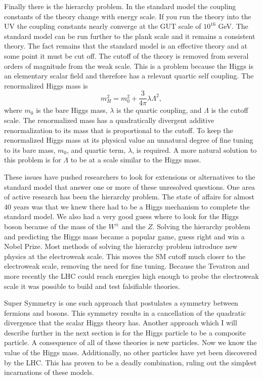 Finally there is the hierarchy problem.
In the standard model the coupling constants of the theory change with energy scale.
If you run the theory into the UV the coupling constants nearly converge at the GUT scale of $10^{16}$ GeV.
The standard model can be run further to the plank scale and it remains a consistent theory.
The fact remains that the standard model is an effective theory and at some point it must be cut off.
The cutoff of the theory is removed from several orders of magnitude from the weak scale.
This is a problem because the Higgs is an elementary scalar field and therefore has a relevant quartic self coupling.
The renormalized Higgs mass is
\begin{equation}
  m^2_H=m_0^2+\frac{3}{4\pi}\lambda\Lambda^2,
\end{equation}
where $m_0$ is the bare Higgs mass, $\lambda$ is the quartic coupling, and $\Lambda$ is the cutoff scale.
The renormalized mass has a quadratically divergent additive renormalization to its mass that is proportional to the cutoff.
To keep the renormalized Higgs mass at its physical value an unnatural degree of fine tuning to its bare mass, $m_0$, and quartic term, $\lambda$, is required.
A more natural solution to this problem is for $\Lambda$ to be at a scale similar to the Higgs mass.

These issues have pushed researchers to look for extensions or alternatives to the standard model that answer one or more of these unresolved questions.
One area of active research has been the hierarchy problem.
The state of affairs for almost 40 years was that we knew there had to be a Higgs mechanism to complete the standard model.
We also had a very good guess where to look for the Higgs boson because of the mass of the $W^{\pm}$ and the $Z$.
Solving the hierarchy problem and predicting the Higgs mass became a popular game, guess right and win a Nobel Prize.
Most methods of solving the hierarchy problem introduce new physics at the electroweak scale.
This moves the SM cutoff much closer to the electroweak scale, removing the need for fine tuning.
Because the Tevatron and more recently the LHC could reach energies high enough to probe the electroweak scale it was possible to build and test falsifiable theories.

Super Symmetry is one such approach that postulates a symmetry between fermions and bosons.
This symmetry results in a cancellation of the quadratic divergence that the scalar Higgs theory has.
Another approach which I will describe further in the next section is for the Higgs particle to be a composite particle.
A consequence of all of these theories is new particles.
Now we know the value of the Higgs mass.
Additionally, no other particles have yet been discovered by the LHC. 
This has proven to be a deadly combination, ruling out the simplest incarnations of these models.
